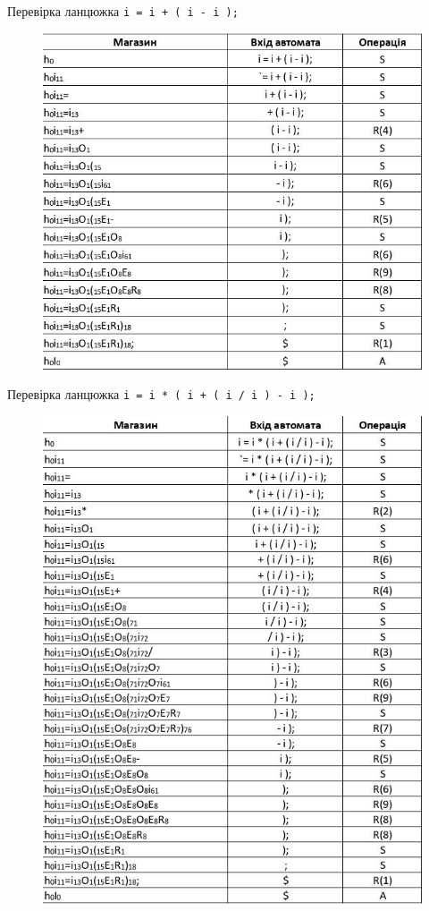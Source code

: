 Перевірка ланцюжка \verb|i = i + ( i - i );|
\begin{figure}[h!]
  \centering
  \includegraphics[width=16cm]{reports/formals/assets/pr1.jpeg}
\end{figure}

\clearpage
Перевірка ланцюжка \verb|i = i * ( i + ( i / i ) - i );|
\begin{figure}[h!]
  \centering
  \includegraphics[width=16cm]{reports/formals/assets/pr2.jpeg}
\end{figure}

